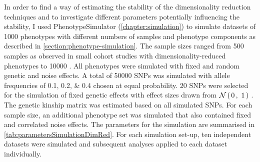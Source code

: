 In order to find a way of estimating the stability of the dimensionality reduction techniques and to investigate different parameters potentially influencing the stability, I used PhenotypeSimulator (\cref{chapter:simulation}) to simulate datasets of \num{1000} phenotypes with different numbers of samples and phenotype components as described in \cref{section:phenotype-simulation}. The sample sizes ranged from \num{500} samples as observed in small cohort studies with dimensionality-reduced phenotypes \citep{Pausova2007} to \num{10000} \citep{Liu2012}. All phenotypes were simulated with fixed and random genetic and noise effects. A total of \num{50000} SNPs was simulated with allele frequencies of \numlist{0.1;0.2;0.4} chosen at equal probability. \num{20} SNPs were selected for the simulation of fixed genetic effects with effect sizes drawn from \(\mathcal{N}\left(\,{0}\,,~{1}\,\right)\) . The genetic kinship matrix was estimated based on all simulated SNPs. For each sample size, an additional phenotype set was simulated that also contained fixed and correlated noise effects. The parameters for the simulation are summarised in \cref{tab:parametersSimulationDimRed}. For each simulation set-up, ten independent datasets were simulated and subsequent analyses applied to each dataset individually.

